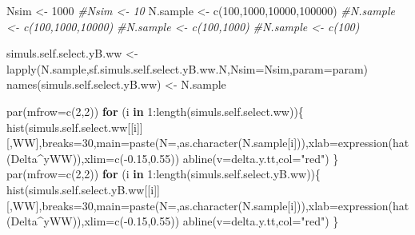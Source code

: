 \documentclass[
]{book}
\newenvironment{Shaded}{\begin{snugshade}}{\end{snugshade}}
\newcommand{\AttributeTok}[1]{\textcolor[rgb]{0.77,0.63,0.00}{#1}}
\newcommand{\CommentTok}[1]{\textcolor[rgb]{0.56,0.35,0.01}{\textit{#1}}}
\newcommand{\ControlFlowTok}[1]{\textcolor[rgb]{0.13,0.29,0.53}{\textbf{#1}}}
\newcommand{\DecValTok}[1]{\textcolor[rgb]{0.00,0.00,0.81}{#1}}
\newcommand{\FloatTok}[1]{\textcolor[rgb]{0.00,0.00,0.81}{#1}}
\newcommand{\FunctionTok}[1]{\textcolor[rgb]{0.00,0.00,0.00}{#1}}
\newcommand{\NormalTok}[1]{#1}
\newcommand{\OtherTok}[1]{\textcolor[rgb]{0.56,0.35,0.01}{#1}}
\newcommand{\SpecialCharTok}[1]{\textcolor[rgb]{0.00,0.00,0.00}{#1}}
\newcommand{\StringTok}[1]{\textcolor[rgb]{0.31,0.60,0.02}{#1}}
\theoremstyle{definition}
\theoremstyle{definition}
\theoremstyle{definition}
\theoremstyle{definition}
\theoremstyle{remark}
\begin{document}
\begin{Shaded}
\begin{Highlighting}[]
\NormalTok{Nsim }\OtherTok{\textless{}{-}} \DecValTok{1000}
\CommentTok{\#Nsim \textless{}{-} 10}
\NormalTok{N.sample }\OtherTok{\textless{}{-}} \FunctionTok{c}\NormalTok{(}\DecValTok{100}\NormalTok{,}\DecValTok{1000}\NormalTok{,}\DecValTok{10000}\NormalTok{,}\DecValTok{100000}\NormalTok{)}
\CommentTok{\#N.sample \textless{}{-} c(100,1000,10000)}
\CommentTok{\#N.sample \textless{}{-} c(100,1000)}
\CommentTok{\#N.sample \textless{}{-} c(100)}

\NormalTok{simuls.self.select.yB.ww }\OtherTok{\textless{}{-}} \FunctionTok{lapply}\NormalTok{(N.sample,sf.simuls.self.select.yB.ww.N,}\AttributeTok{Nsim=}\NormalTok{Nsim,}\AttributeTok{param=}\NormalTok{param)}
\FunctionTok{names}\NormalTok{(simuls.self.select.yB.ww) }\OtherTok{\textless{}{-}}\NormalTok{ N.sample}
\end{Highlighting}
\end{Shaded}

\begin{Shaded}
\begin{Highlighting}[]
\FunctionTok{par}\NormalTok{(}\AttributeTok{mfrow=}\FunctionTok{c}\NormalTok{(}\DecValTok{2}\NormalTok{,}\DecValTok{2}\NormalTok{))}
\ControlFlowTok{for}\NormalTok{ (i }\ControlFlowTok{in} \DecValTok{1}\SpecialCharTok{:}\FunctionTok{length}\NormalTok{(simuls.self.select.ww))\{}
  \FunctionTok{hist}\NormalTok{(simuls.self.select.ww[[i]][,}\StringTok{\textquotesingle{}WW\textquotesingle{}}\NormalTok{],}\AttributeTok{breaks=}\DecValTok{30}\NormalTok{,}\AttributeTok{main=}\FunctionTok{paste}\NormalTok{(}\StringTok{\textquotesingle{}N=\textquotesingle{}}\NormalTok{,}\FunctionTok{as.character}\NormalTok{(N.sample[i])),}\AttributeTok{xlab=}\FunctionTok{expression}\NormalTok{(}\FunctionTok{hat}\NormalTok{(Delta}\SpecialCharTok{\^{}}\NormalTok{yWW)),}\AttributeTok{xlim=}\FunctionTok{c}\NormalTok{(}\SpecialCharTok{{-}}\FloatTok{0.15}\NormalTok{,}\FloatTok{0.55}\NormalTok{))}
  \FunctionTok{abline}\NormalTok{(}\AttributeTok{v=}\NormalTok{delta.y.tt,}\AttributeTok{col=}\StringTok{"red"}\NormalTok{)}
\NormalTok{\}}
\FunctionTok{par}\NormalTok{(}\AttributeTok{mfrow=}\FunctionTok{c}\NormalTok{(}\DecValTok{2}\NormalTok{,}\DecValTok{2}\NormalTok{))}
\ControlFlowTok{for}\NormalTok{ (i }\ControlFlowTok{in} \DecValTok{1}\SpecialCharTok{:}\FunctionTok{length}\NormalTok{(simuls.self.select.yB.ww))\{}
  \FunctionTok{hist}\NormalTok{(simuls.self.select.yB.ww[[i]][,}\StringTok{\textquotesingle{}WW\textquotesingle{}}\NormalTok{],}\AttributeTok{breaks=}\DecValTok{30}\NormalTok{,}\AttributeTok{main=}\FunctionTok{paste}\NormalTok{(}\StringTok{\textquotesingle{}N=\textquotesingle{}}\NormalTok{,}\FunctionTok{as.character}\NormalTok{(N.sample[i])),}\AttributeTok{xlab=}\FunctionTok{expression}\NormalTok{(}\FunctionTok{hat}\NormalTok{(Delta}\SpecialCharTok{\^{}}\NormalTok{yWW)),}\AttributeTok{xlim=}\FunctionTok{c}\NormalTok{(}\SpecialCharTok{{-}}\FloatTok{0.15}\NormalTok{,}\FloatTok{0.55}\NormalTok{))}
  \FunctionTok{abline}\NormalTok{(}\AttributeTok{v=}\NormalTok{delta.y.tt,}\AttributeTok{col=}\StringTok{"red"}\NormalTok{)}
\NormalTok{\}}
\end{Highlighting}
\end{Shaded}
\end{document}
